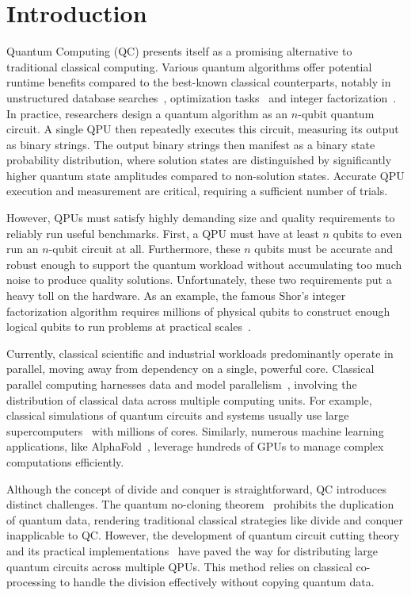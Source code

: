 \section{Introduction}

Quantum Computing (QC) presents itself as a promising alternative to traditional classical computing.
Various quantum algorithms offer potential runtime benefits compared to the best-known classical counterparts,
notably in unstructured database searches~\cite{grover1996fast},
optimization tasks~\cite{moll2018quantum} and integer factorization~\cite{shor1999polynomial}.
In practice, researchers design a quantum algorithm as an $n$-qubit quantum circuit.
A single QPU then repeatedly executes this circuit,
measuring its output as binary strings.
The output binary strings then manifest as a binary state probability distribution,
where solution states are distinguished by significantly higher quantum state amplitudes compared to non-solution states.
Accurate QPU execution and measurement are critical,
requiring a sufficient number of trials.

However, QPUs must satisfy highly demanding size and quality requirements to reliably run useful benchmarks.
First, a QPU must have at least $n$ qubits to even run an $n$-qubit circuit at all.
Furthermore, these $n$ qubits must be accurate and robust enough to support the quantum workload without accumulating too much noise to produce quality solutions.
Unfortunately, these two requirements put a heavy toll on the hardware.
As an example, the famous Shor's integer factorization algorithm requires millions of physical qubits to construct enough logical qubits to run problems at practical scales~\cite{suchara2013comparing}.

Currently, classical scientific and industrial workloads predominantly operate in parallel,
moving away from dependency on a single, powerful core.
Classical parallel computing harnesses data and model parallelism~\cite{shoeybi2019megatron,huang2019gpipe},
involving the distribution of classical data across multiple computing units.
For example, classical simulations of quantum circuits and systems usually use large supercomputers~\cite{liu2021closing} with millions of cores.
Similarly, numerous machine learning applications, like AlphaFold~\cite{jumper2021highly},
leverage hundreds of GPUs to manage complex computations efficiently.

Although the concept of divide and conquer is straightforward,
QC introduces distinct challenges.
The quantum no-cloning theorem~\cite{wootters1982single} prohibits the duplication of quantum data,
rendering traditional classical strategies like divide and conquer inapplicable to QC.
However, the development of quantum circuit cutting theory~\cite{peng2020simulating}
and its practical implementations~\cite{tang2021cutqc} have paved the way for distributing large quantum circuits across multiple QPUs.
This method relies on classical co-processing to handle the division effectively without copying quantum data.

